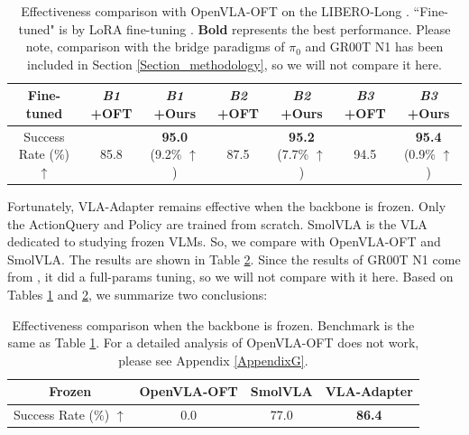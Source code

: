 \begin{table}[!htbp]
	\centering
    \small
    \setlength{\tabcolsep}{1.7mm}
	\caption{Effectiveness comparison with OpenVLA-OFT \citep{OpenVLA-OFT-2025} on the LIBERO-Long \citep{LIBERO-2023}. ``Fine-tuned" is by LoRA fine-tuning \citep{LoRA-2022}. \textbf{Bold} represents the best performance. Please note, comparison with the bridge paradigms of $\pi_0$ \citep{pi0-2025} and GR00T N1 \citep{GR00T-N1-2025} has been included in Section \ref{Section_methodology}, so we will not compare it here.}\label{Table_effectiveness}
	\begin{tabular}{c|cc|cc|cc}
		\toprule[1pt]
		Fine-tuned &  \textit{\textbf{B1}} +OFT   & \textit{\textbf{B1}} +Ours  & \textit{\textbf{B2}} +OFT   & \textit{\textbf{B2}} +Ours  & \textit{\textbf{B3}} +OFT   & \textit{\textbf{B3}} +Ours \\
		\midrule[0.5pt]
		Success Rate (\%) $\uparrow$    & 85.8  & \textbf{95.0} (9.2\% $\uparrow$)  & 87.5  &    \textbf{95.2} (7.7\% $\uparrow$)  & 94.5  & \textbf{95.4} (0.9\% $\uparrow$)\\
		\bottomrule[1pt]
	\end{tabular}%
\end{table}%

Fortunately, VLA-Adapter remains effective when the backbone is frozen. Only the ActionQuery and Policy are trained from scratch. SmolVLA \citep{SmolVLA-2025} is the VLA dedicated to studying frozen VLMs. So, we compare with OpenVLA-OFT and SmolVLA. The results are shown in Table \ref{Table_frozen}. Since the results of GR00T N1 come from \citep{Hume-2025}, it did a full-params tuning, so we will not compare with it here. Based on Tables \ref{Table_effectiveness} and \ref{Table_frozen}, we summarize two conclusions:

\begin{table}[t]
	\centering
    \small
	\caption{Effectiveness comparison when the backbone is frozen. Benchmark is the same as Table \ref{Table_effectiveness}. For a detailed analysis of OpenVLA-OFT \citep{OpenVLA-OFT-2025} does not work, please see Appendix \ref{AppendixG}.}\label{Table_frozen}
	\begin{tabular}{c|ccc}
		\toprule[1pt]
		Frozen & OpenVLA-OFT&SmolVLA&\textbf{VLA-Adapter}\\
		\midrule[0.5pt]
		\multicolumn{1}{c|}{Success Rate (\%) $\uparrow$}  & 0.0 & 77.0 &\textbf{86.4}\\
		\bottomrule[1pt]
	\end{tabular}%
\end{table}%



